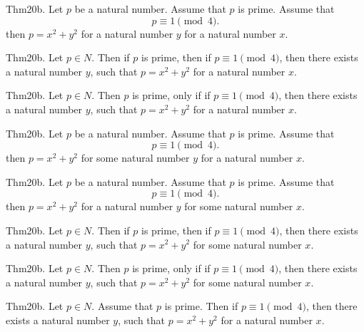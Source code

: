 \documentclass{article}
\begin{document}
Thm20b. Let $p$ be a natural number. Assume that $p$ is prime. Assume that $$p \equiv 1 \pmod{ 4}.$$ then $p = x ^{ 2}+ y ^{ 2}$ for a natural number $y$ for a natural number $x$.

Thm20b. Let $p \in N$. Then if $p$ is prime, then if $p \equiv 1 \pmod{ 4}$, then there exists a natural number $y$, such that $p = x ^{ 2}+ y ^{ 2}$ for a natural number $x$.

Thm20b. Let $p \in N$. Then $p$ is prime, only if if $p \equiv 1 \pmod{ 4}$, then there exists a natural number $y$, such that $p = x ^{ 2}+ y ^{ 2}$ for a natural number $x$.

Thm20b. Let $p$ be a natural number. Assume that $p$ is prime. Assume that $$p \equiv 1 \pmod{ 4}.$$ then $p = x ^{ 2}+ y ^{ 2}$ for some natural number $y$ for a natural number $x$.

Thm20b. Let $p$ be a natural number. Assume that $p$ is prime. Assume that $$p \equiv 1 \pmod{ 4}.$$ then $p = x ^{ 2}+ y ^{ 2}$ for a natural number $y$ for some natural number $x$.

Thm20b. Let $p \in N$. Then if $p$ is prime, then if $p \equiv 1 \pmod{ 4}$, then there exists a natural number $y$, such that $p = x ^{ 2}+ y ^{ 2}$ for some natural number $x$.

Thm20b. Let $p \in N$. Then $p$ is prime, only if if $p \equiv 1 \pmod{ 4}$, then there exists a natural number $y$, such that $p = x ^{ 2}+ y ^{ 2}$ for some natural number $x$.

Thm20b. Let $p \in N$. Assume that $p$ is prime. Then if $p \equiv 1 \pmod{ 4}$, then there exists a natural number $y$, such that $p = x ^{ 2}+ y ^{ 2}$ for a natural number $x$.
\end{document}
